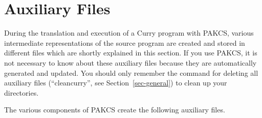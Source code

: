 \documentclass[11pt,fleqn]{article}
\renewcommand{\tt}{\usefont{OT1}{cmtt}{m}{n}\selectfont}
\newcommand{\codefont}{\small\tt}
\newcommand{\code}[1]{\mbox{\codefont #1}}
\newcommand{\ccode}[1]{``\code{#1}''}
\newcommand{\CYS}{PAKCS\xspace} %
\begin{document}
\newpage

\section{Auxiliary Files}
\label{sec-auxfiles}

During the translation and execution of a Curry program with \CYS,
various intermediate representations of the source program are created
and stored in different files which are shortly explained in this section.
If you use \CYS, it is not necessary to know about
these auxiliary files because they are automatically generated
and updated. You should only remember the command for deleting
all auxiliary files (\ccode{cleancurry}, see Section~\ref{sec-general})
to clean up your directories.

The various components of \CYS create
the following auxiliary files.
\end{document}
